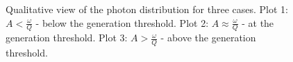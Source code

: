 \begin{figure}
\centering



\caption{Qualitative view of the photon distribution for three cases. 
  Plot 1: $A < \frac{\omega}{Q}$ - below the generation threshold.
  Plot 2: $A \approx \frac{\omega}{Q}$ - at the generation threshold.
  Plot 3: $A > \frac{\omega}{Q}$ - above the generation threshold.}
\label{figPart2Ch1_3}
\end{figure}